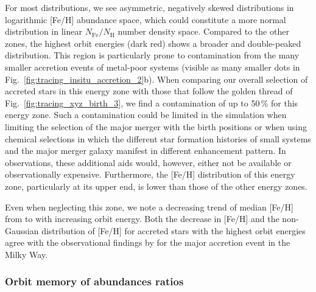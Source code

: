 \documentclass[fleqn,usenatbib]{mnras}
\begin{document}
For most distributions, we see asymmetric, negatively skewed distributions in logarithmic [Fe/H] abundance space, which could constitute a more normal distribution in linear $N_\mathrm{Fe}/N_\mathrm{H}$ number density space. Compared to the other zones, the highest orbit energies (dark red) shows a broader and double-peaked distribution. This region is particularly prone to contamination from the many smaller accretion events of metal-poor systems (visible as many smaller dots in Fig.~\ref{fig:tracing_insitu_accretion_2}b). When comparing our overall selection of accreted stars in this energy zone with those that follow the golden thread of Fig.~\ref{fig:tracing_xyz_birth_3}, we find a contamination of up to 50\,\% for this energy zone. Such a contamination could be limited in the simulation when limiting the selection of the major merger with the birth positions or when using chemical selections in which the different star formation histories of small systems and the major merger galaxy manifest in different enhancement pattern. In observations, these additional aids would, however, either not be available or observationally expensive. Furthermore, the [Fe/H] distribution of this energy zone, particularly at its upper end, is lower than those of the other energy zones.

Even when neglecting this zone, we note a decreasing trend of median [Fe/H] from  to  with increasing orbit energy. Both the decrease in [Fe/H] and the non-Gaussian distribution of [Fe/H] for accreted stars with the highest orbit energies agree with the observational findings by \citet[][see their Fig.~3]{Skuladottir2025} for the major accretion event in the Milky Way.

\subsubsection{Orbit memory of abundances ratios}
\end{document}
